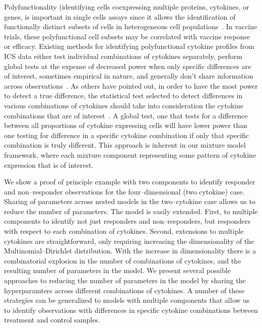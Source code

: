 \documentclass[11pt]{article}
\begin{document}
Polyfunctionality (identifying cells coexpressing multiple proteins, cytokines, or genes, is important in single cells assays since it allows the identification of functionally distinct subsets of cells in heterogeneous cell populations~\cite{Milush:2009bz}. In vaccine trials, these polyfunctional cell subsets may be correlated with vaccine response or efficacy. Existing methods for identifying polyfunctional cytokine profiles from ICS data either test individual combinations of cytokines separately, perform global tests at the expense of decreased power when only specific differences are of interest, sometimes  empirical in nature, and generally don't share information across observations~\cite{Dittrich:2012bv,Trigona:2003,Sinclair:2004hs,Horton:2007tsa,Proschan:2009ks,Nason:2006dx}. As others have pointed out, in order to have the most power to detect a true difference, the statistical test selected to detect differences in various combinations of cytokines should take into consideration the cytokine combinations that are of interest~\cite{Nason:2006dx}. A global test, one that tests for a difference between all proportions of cytokine expressing cells will have lower power than one testing for difference in a specific cytokine combination if only that specific combination is truly different. This approach is inherent in our mixture model framework, where each mixture component representing some pattern of cytokine expression that is of interest.

We show a proof of principle example with two components to identify responder and non--responder observations for the four--dimensional (two cytokine) case. Sharing of parameters across nested models in the two--cytokine case allows us to reduce the number of parameters. The model is easily extended. First, to multiple components to identify not just responders and non--responders, but responders with respect to each combination of cytokines. Second, extensions to multiple cytokines are straightforward, only requiring increasing the dimensionality of the Multinomial--Dirichlet distribution. With the increase in dimensionality there is a combinatorial explosion in the number of combinations of cytokines, and the resulting number of parameters in the model. We present several possible approaches to reducing the number of parameters in the model by sharing the hyperparamters across different combinations of cytokines. A number of these strategies can be generalized to models with multiple components that allow us to identify observations with differences in specific cytokine combinations between treatment and control samples.
\end{document}
